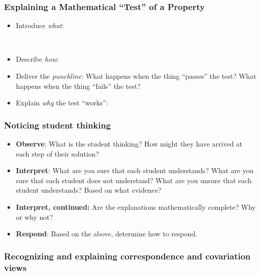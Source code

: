 \documentclass[11pt]{article}
\theoremstyle{definition}
\begin{document}
\subsubsection*{Explaining a Mathematical ``Test'' of a Property}

\begin{itemize}
\item Introduce {\it what}:	
	 \vspace*{-12pt}$\;$

\item Describe {\it how}:

\item Deliver the {\it punchline}: What happens when the thing ``passes'' the test? What happens when the thing ``fails'' the test?
\item Explain {\it why} the test ``works'': 
\end{itemize}

\subsubsection*{Noticing student thinking}
\begin{itemize}
\item {\bf Observe}: What is the student thinking? How might they have arrived at each step of their solution?
\item {\bf Interpret}: What are you sure that each student understands? What are you sure that each student
does not understand? What are you unsure that each student understands?  Based on what evidence?	
\item {\bf Interpret, continued:} Are the explanations mathematically complete? Why or why not?
\item {\bf Respond}: Based on the above, determine how to respond.
\end{itemize}


\subsubsection*{Recognizing and explaining correspondence and covariation views}
\end{document}
